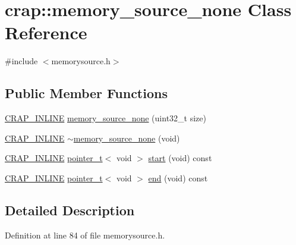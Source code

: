 \hypertarget{classcrap_1_1memory__source__none}{\section{crap\+:\+:memory\+\_\+source\+\_\+none Class Reference}
\label{classcrap_1_1memory__source__none}
}


{\ttfamily \#include $<$memorysource.\+h$>$}

\subsection*{Public Member Functions}
\begin{DoxyCompactItemize}
\item 
\hyperlink{config__x86_8h_a5a40526b8d842e7ff731509998bb0f1c}{C\+R\+A\+P\+\_\+\+I\+N\+L\+I\+N\+E} \hyperlink{classcrap_1_1memory__source__none_a119d02b5c04855dd3e54a97c3d477020}{memory\+\_\+source\+\_\+none} (uint32\+\_\+t size)
\item 
\hyperlink{config__x86_8h_a5a40526b8d842e7ff731509998bb0f1c}{C\+R\+A\+P\+\_\+\+I\+N\+L\+I\+N\+E} \hyperlink{classcrap_1_1memory__source__none_aca705d4bf8ac1bc924448c925f56bf90}{$\sim$memory\+\_\+source\+\_\+none} (void)
\item 
\hyperlink{config__x86_8h_a5a40526b8d842e7ff731509998bb0f1c}{C\+R\+A\+P\+\_\+\+I\+N\+L\+I\+N\+E} \hyperlink{structcrap_1_1pointer__t}{pointer\+\_\+t}$<$ void $>$ \hyperlink{classcrap_1_1memory__source__none_afb16be2e0f1381e08f4be56753b4625a}{start} (void) const 
\item 
\hyperlink{config__x86_8h_a5a40526b8d842e7ff731509998bb0f1c}{C\+R\+A\+P\+\_\+\+I\+N\+L\+I\+N\+E} \hyperlink{structcrap_1_1pointer__t}{pointer\+\_\+t}$<$ void $>$ \hyperlink{classcrap_1_1memory__source__none_a210a46d12d0e6d111c7e341f66e66299}{end} (void) const 
\end{DoxyCompactItemize}


\subsection{Detailed Description}


Definition at line 84 of file memorysource.\+h.



